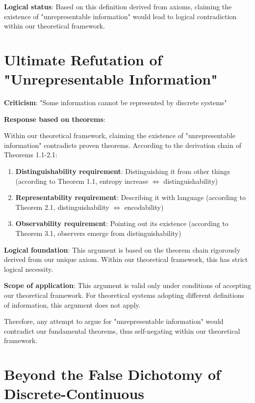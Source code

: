 \textbf{Logical status}: Based on this definition derived from axioms, claiming the existence of "unrepresentable information" would lead to logical contradiction within our theoretical framework.

\section{Ultimate Refutation of "Unrepresentable Information"}
\label{sec:ch07_defense:ultimate-refutation-of-unrepresentable-information}

\textbf{Criticism}: "Some information cannot be represented by discrete systems"

\textbf{Response based on theorems}:

Within our theoretical framework, claiming the existence of "unrepresentable information" contradicts proven theorems. According to the derivation chain of Theorems 1.1-2.1:

\begin{enumerate}
\item \textbf{Distinguishability requirement}: Distinguishing it from other things (according to Theorem 1.1, entropy increase $\Leftrightarrow$ distinguishability)
\item \textbf{Representability requirement}: Describing it with language (according to Theorem 2.1, distinguishability $\Leftrightarrow$ encodability)
\item \textbf{Observability requirement}: Pointing out its existence (according to Theorem 3.1, observers emerge from distinguishability)
\end{enumerate}

\textbf{Logical foundation}: This argument is based on the theorem chain rigorously derived from our unique axiom. Within our theoretical framework, this has strict logical necessity.

\textbf{Scope of application}: This argument is valid only under conditions of accepting our theoretical framework. For theoretical systems adopting different definitions of information, this argument does not apply.

Therefore, any attempt to argue for "unrepresentable information" would contradict our fundamental theorems, thus self-negating within our theoretical framework.

\section{Beyond the False Dichotomy of Discrete-Continuous}
\label{sec:ch07_defense:beyond-the-false-dichotomy-of-discrete-continuous}

